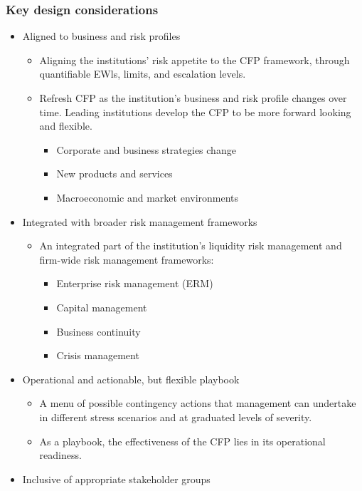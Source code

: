 \subsubsection{Key design considerations}
\begin{itemize}
\item Aligned to business and risk profiles
    \begin{itemize}
    \item Aligning the institutions' risk appetite to the CFP framework, through quantifiable EWls, limits, and escalation levels.
    \item Refresh CFP as the institution's business and risk profile changes over time. Leading institutions develop the CFP to be more forward looking and flexible.
        \begin{itemize}
        \item Corporate and business strategies change
        \item New products and services
        \item Macroeconomic and market environments
        \end{itemize}
    \end{itemize}
\item Integrated with broader risk management frameworks
    \begin{itemize}
    \item An integrated part of the institution's liquidity risk management and firm-wide risk management frameworks:
        \begin{itemize}
        \item Enterprise risk management (ERM)
        \item Capital management
        \item Business continuity
        \item Crisis management
        \end{itemize}
    \end{itemize}
\item Operational and actionable, but flexible playbook
    \begin{itemize}
    \item A menu of possible contingency actions that management can undertake in different stress scenarios and at graduated levels of severity.
    \item As a playbook, the effectiveness of the CFP lies in its operational readiness.
    \end{itemize}
\item Inclusive of appropriate stakeholder groups

\end{itemize}
